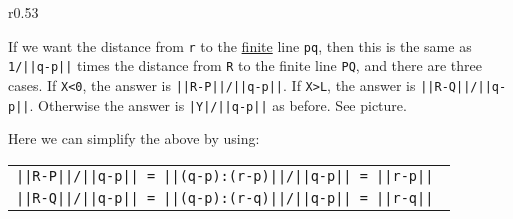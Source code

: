 \documentclass[12pt]{article}
\begin{document}
\medskip

\begin{minipage}{\textwidth}\raggedright
\begin{wrapfigure}{r}{0.53\textwidth}
\end{wrapfigure}
If we want the distance from {\tt r} to the \underline{finite} line {\tt pq},
then this is the same as {\tt 1/||q-p||} times
the distance from {\tt R} to the finite
line {\tt PQ}, and there are three cases.
If {\tt X<0}, the answer
is {\small \tt ||R-P||/||q-p||}.  If {\tt X>L},
the answer is {\small \tt ||R-Q||/||q-p||}.
Otherwise the answer is {\small \tt |Y|/||q-p||} as before.
See picture.
\end{minipage}

\medskip

Here we can simplify the above by using: \\
\begin{tabular}{@{~~}l}
\tt ||R-P||/||q-p|| = ||(q-p):(r-p)||/||q-p|| = ||r-p|| \\
\tt ||R-Q||/||q-p|| = ||(q-p):(r-q)||/||q-p|| = ||r-q|| \\
\end{tabular}
\end{document}
